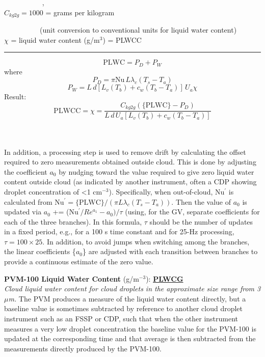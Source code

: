 \begin{hangparagraphs}
{\begin{minipage}[t]{0.95\textwidth}
~~~~~~~~~~%
, \\
$C_{kg2g}=1000$
= grams per kilogram 

~~~~~~~~~~(unit conversion to conventional units for liquid
water content)\\
$\chi$ = liquid water
content (g/m$^{3}$) = PLWCC

\rule[0.5ex]{1\linewidth}{1pt}
\[
\mathrm{PLWC}=P_{D}+P_{W}
\]
where
\[
P_{D}=\pi\mathrm{Nu}\,L\lambda_{c}(T_{s}-T_{a})
\]
\[
P_{W}=L\,d[L_{v}(T_{b})+c_{w}(T_{b}-T_{a})]\,U_{a}\chi
\]
Result:
\[
\mathrm{PLWCC}=\chi=\frac{C_{kg2g}(\mathrm{\{PLWC\}}-P_{D})}{L\,d\,U_{a}[L_{v}(T_{b})+c_{w}(T_{b}-T_{a})]}
\]
%
\end{minipage}}\\
\\
In addition, a processing step is used to remove drift by calculating
the offset required to zero measurements obtained outside cloud. This
is done by adjusting the coefficient $a_{0}$ by nudging toward the
value required to give zero liquid water content outside cloud (as
indicated by another instrument, often a CDP showing droplet concentration
of <1 cm$^{-3}$). Specifically, when out-of-cloud, Nu$^{\prime}$
is calculated from Nu$^{\prime}=\mathrm{\{PLWC\}}/(\pi L\lambda_{c}(T_{s}-T_{a}))$.
Then the value of $a_{0}$ is updated via $a_{0}$ += (Nu$^{\prime}/Re^{a_{1}}-a_{0})/\tau$
(using, for the GV, separate coefficients for each of the three branches).
In this formula, $\tau$ should be the number of updates in a fixed
period, e.g., for a 100 s time constant and for 25-Hz processing,
$\tau=100\times25$. In addition, to avoid jumps when switching among
the branches, the linear coefficients \{$a_{0}$\} are adjusted with
each transition between branches to provide a continuous estimate
of the zero value.

\textbf{PVM-100 Liquid Water Content} (g/m$^{-3}$):\hypertarget{PLWCG}{}\textbf{
}\textbf{\uline{PLWCG}}\textbf{}\\
\emph{Cloud liquid water content for cloud droplets in the approximate
size range from 3 $\mu$m. }The PVM produces a measure
of the liquid water content directly, but a baseline value is sometimes
subtracted by reference to another cloud droplet instrument such as
an FSSP or CDP, such that when the other instrument measures a very
low droplet concentration the baseline value for the PVM-100 is updated
at the corresponding time and that average is then subtracted from
the measurements directly produced by the PVM-100.\label{punch:5-1}


\end{hangparagraphs}

